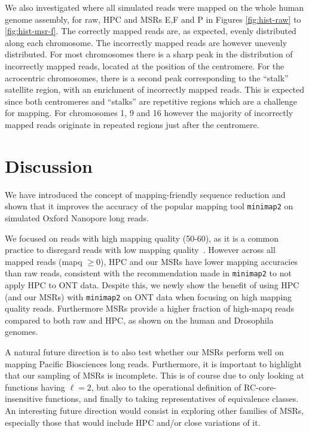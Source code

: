 \documentclass[
  11pt,
  twoside]{scrbook}
\begin{document}
We also investigated where all simulated reads were mapped on the whole human
genome assembly, for raw, HPC and MSRs E,F and P in Figures \ref{fig:hist-raw}
to \ref{fig:hist-msr-f}. The correctly mapped reads are, as expected, evenly
distributed along each chromosome. The incorrectly mapped reads are however
unevenly distributed. For most chromosomes there is a sharp peak in the
distribution of incorrectly mapped reads, located at the position of the
centromere. For the acrocentric chromosomes, there is a second peak
corresponding to the ``stalk'' satellite region, with an enrichment of incorrectly
mapped reads. This is expected since both centromeres and ``stalks'' are
repetitive regions which are a challenge for mapping. For chromosomes 1, 9 and
16 however the majority of incorrectly mapped reads originate in repeated
regions just after the centromere.

\hypertarget{hpc-discussion}{%
\section{Discussion}\label{hpc-discussion}}

We have introduced the concept of mapping-friendly sequence reduction and shown
that it improves the accuracy of the popular mapping tool \texttt{minimap2} on
simulated Oxford Nanopore long reads.

We focused on reads with high mapping quality (50-60), as it is a common
practice to disregard reads with low mapping
quality~\autocite{prodanovSensitiveAlignmentUsing2020,liNewStrategiesImprove2021,liSyntheticdiploidBenchmarkAccurate2018}. However across all mapped reads (mapq
\(\geq 0\)), HPC and our MSRs have lower mapping accuracies than raw reads,
consistent with the recommendation made in \texttt{minimap2} to not apply HPC to ONT
data. Despite this, we newly show the benefit of using HPC (and our MSRs) with
\texttt{minimap2} on ONT data when focusing on high mapping quality reads. Furthermore
MSRs provide a higher fraction of high-mapq reads compared to both raw and HPC,
as shown on the human and Drosophila genomes.

A natural future direction is to also test whether our MSRs perform well on
mapping Pacific Biosciences long reads. Furthermore, it is important to
highlight that our sampling of MSRs is incomplete. This is of course due to only
looking at functions having \(\ell=2\), but also to the operational definition of
RC-core-insensitive functions, and finally to taking representatives of
equivalence classes. An interesting future direction would consist in exploring
other families of MSRs, especially those that would include HPC and/or close
variations of it.
\end{document}
